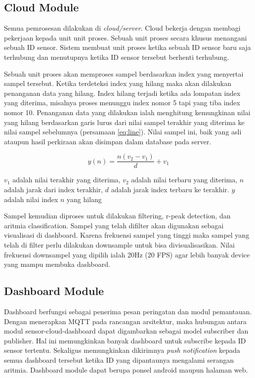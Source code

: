 \documentclass[]{indojc}
\begin{document}
\subsection{Cloud Module}
Semua pemrosesan dilakukan di \textit{cloud/server}. Cloud bekerja dengan membagi pekerjaan kepada unit unit proses. Sebuah unit proses secara khusus menangani sebuah ID sensor. Sistem membuat unit proses ketika sebuah ID sensor baru saja terhubung dan menutupnya ketika ID sensor tersebut berhenti terhubung. 

Sebuah unit proses akan memproses sampel berdasarkan index yang menyertai sampel tersebut. Ketika terdeteksi index yang hilang maka akan dilakukan penanganan data yang hilang. Index hilang terjadi ketika ada lompatan index yang diterima, misalnya proses menunggu index nomor 5 tapi yang tiba index nomor 10. Penanganan data yang dilakukan ialah menghitung kemungkinan nilai yang hilang berdasarkan garis lurus dari nilai sampel terakhir yang diterima ke nilai sampel sebelumnya (persamaan \ref{eq:line}). Nilai sampel ini, baik yang asli ataupun hasil perkiraan akan disimpan dalam database pada server.

\begin{equation}
y(n) = \dfrac{n (v_{2} - v_{1})}{d} + v_{1}
\label{eq:line}
\end{equation}

$v_{1}$ adalah nilai terakhir yang diterima, $v_{2}$ adalah nilai terbaru yang diterima, $n$ adalah jarak dari index terakhir, $d$ adalah jarak index terbaru ke terakhir. $y$ adalah nilai index $n$ yang hilang

Sampel kemudian diproses untuk dilakukan filtering, r-peak detection, dan aritmia classification. Sampel yang telah difilter akan digunakan sebagai visualisasi di dashboard. Karena frekuensi sampel yang tinggi maka sampel yang telah di filter perlu dilakukan downsample untuk bisa divisualisasikan. Nilai frekuensi downsampel yang dipilih ialah 20Hz (20 FPS) agar lebih banyak device yang mampu membuka dashboard.

\subsection{Dashboard Module}
Dashboard berfungsi sebagai penerima pesan peringatan dan modul pemantauan. Dengan menerapkan MQTT pada rancangan arsitektur, maka hubungan antara modul sensor-cloud-dashboard dapat digambarkan sebagai model subscriber dan publisher. Hal ini memungkinkan banyak dashboard untuk subscribe kepada ID sensor tertentu. Sekaligus memungkinkan dikirimnya \textit{push notification} kepada semua dashboard tersebut ketika ID yang dipantaunya mengalami serangan aritmia. Dashboard module dapat berupa ponsel android maupun halaman web.
\end{document}
